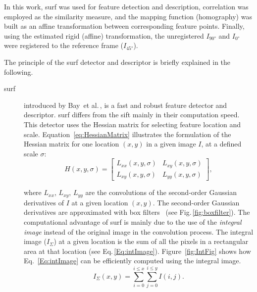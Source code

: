 In this work, \ac{surf} was used for feature detection and description, correlation was employed as the similarity measure, and the mapping function (homography) was built as an affine transformation between corresponding feature points.
Finally, using the estimated rigid (affine) transformation, the unregistered $I_{\ang{90}}$ and $I_{\ang{0}}$ were registered to the reference frame ($I_{\ang{45}}$).

The principle of the \ac{surf} detector and descriptor is briefly explained in the following.
\begin{description}
	\item[\acf{surf}] introduced by Bay~et al.\,\cite{bay2006surf}, is a fast and robust feature detector and descriptor.
	\ac{surf} differs from the \ac{sift} mainly in their computation speed.
	This detector uses the Hessian matrix for selecting feature location and scale. 
	Equation~\ref{eq:HessianMatrix} illustrates the formulation of the Hessian matrix for one location $(x,y)$ in a given image $I$, at a defined scale $\sigma$:
		\begin{equation}
		\label{eq:HessianMatrix}
			H(x,y,\sigma) = 
			\begin{bmatrix}
			L_{xx}(x,y,\sigma) & L_{xy}(x,y,\sigma)\\
			L_{xy}(x,y,\sigma) & L_{yy}(x,y,\sigma)
			\end{bmatrix}, 
		\end{equation}
	
	\noindent where $L_{xx}$, $L_{xy}$, $L_{yy}$ are the convolutions of the second-order Gaussian derivatives of $I$ at a given location $(x,y)$.
	The second-order Gaussian derivatives are approximated with box filters~\cite{bay2006surf} (see Fig.\,\ref{fig:boxfilter}).
	The computational advantage of \ac{surf} is mainly due to the use of the \textit{integral image} instead of the original image in the convolution process.
	The integral image ($I_{\Sigma}$) at a given location is the sum of all the pixels in a rectangular area at that location (see Eq.\,\ref{Eq:intImage}).
	Figure~\ref{fig:IntFig} shows how Eq.~\ref{Eq:intImage} can be efficiently computed using the integral image. 
		\begin{equation}
		\label{Eq:intImage}
		I_{\Sigma} (x,y) = \sum_{i=0}^{i\leq x} \sum_{j=0}^{i\leq y} I(i,j).
		\end{equation}
	

\end{description}
